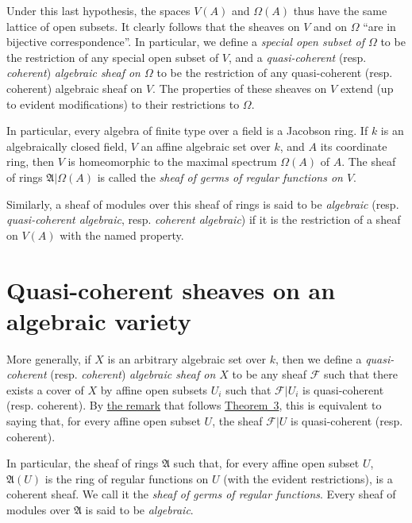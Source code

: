 \documentclass{article}
\newcommand{\scr}[1]{{\mathscr{#1}}}
\newcommand{\oldpage}[1]{\marginpar{\footnotesize$\Big\vert$ \textit{p.~#1}}}
\begin{document}
Under this last hypothesis, the spaces $V(A)$ and $\Omega(A)$ thus have the same lattice of open subsets.
It clearly follows that the sheaves on $V$ and on $\Omega$ ``are in bijective correspondence''.
In particular, we define a \emph{special open subset of $\Omega$} to be the restriction of any special open subset of $V$, and a \emph{quasi-coherent} (resp. \emph{coherent}) \emph{algebraic sheaf on $\Omega$} to be the restriction of any quasi-coherent (resp. coherent) algebraic sheaf on $V$.
The properties of these sheaves on $V$ extend (up to evident modifications) to their restrictions to $\Omega$.

In particular, every algebra of finite type over a field is a Jacobson ring.
If $k$ is an algebraically closed field, $V$ an affine algebraic set over $k$, and $A$ its coordinate ring, then $V$ is homeomorphic to the maximal spectrum
\oldpage{1-12}
$\Omega(A)$ of $A$.
The sheaf of rings $\mathfrak{A}|\Omega(A)$ is called the \emph{sheaf of germs of regular functions on $V$}.

Similarly, a sheaf of modules over this sheaf of rings is said to be \emph{algebraic} (resp. \emph{quasi-coherent algebraic}, resp. \emph{coherent algebraic}) if it is the restriction of a sheaf on $V(A)$ with the named property.


\section{Quasi-coherent sheaves on an algebraic variety}
\label{section6}

More generally, if $X$ is an arbitrary algebraic set over $k$, then we define a \emph{quasi-coherent} (resp. \emph{coherent}) \emph{algebraic sheaf on $X$} to be any sheaf $\scr{F}$ such that there exists a cover of $X$ by affine open subsets $U_i$ such that $\scr{F}|U_i$ is quasi-coherent (resp. coherent).
By \hyperref[remark-theorem3]{the remark} that follows \hyperref[theorem3]{Theorem~3}, this is equivalent to saying that, for every affine open subset $U$, the sheaf $\scr{F}|U$ is quasi-coherent (resp. coherent).

In particular, the sheaf of rings $\mathfrak{A}$ such that, for every affine open subset $U$, $\mathfrak{A}(U)$ is the ring of regular functions on $U$ (with the evident restrictions), is a coherent sheaf.
We call it the \emph{sheaf of germs of regular functions}.
Every sheaf of modules over $\mathfrak{A}$ is said to be \emph{algebraic}.


\end{document}
